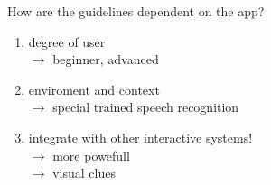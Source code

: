 \documentclass[
  10pt
, handout
]{beamer}
\begin{document}
\begin{frame}{How are the guidelines dependent on the app?}
  \begin{enumerate}
    \item<+-> {degree of user} \\
               $\rightarrow$ beginner, advanced
    \item<+-> {enviroment and context} \\
               $\rightarrow$ special trained speech recognition             
    \item<+-> {integrate with other interactive systems!} \\
               $\rightarrow$ more powefull \\         
               $\rightarrow$ visual clues
  \end{enumerate}
\end{frame}
\end{document}

